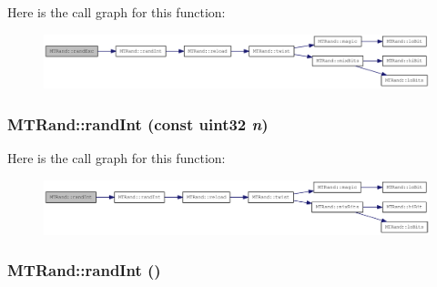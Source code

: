 Here is the call graph for this function:\nopagebreak
\begin{figure}[H]
\begin{center}
\leavevmode
\includegraphics[width=409pt]{classMTRand_afd05e468983b3a3d66ce0f403bd666af_cgraph}
\end{center}
\end{figure}
\hypertarget{classMTRand_a3515bbf6e1b46680a4ce6968451942b6}{
\subsubsection[{randInt}]{ MTRand::randInt (const {\bf uint32} {\em n})}}
\label{classMTRand_a3515bbf6e1b46680a4ce6968451942b6}


Here is the call graph for this function:\nopagebreak
\begin{figure}[H]
\begin{center}
\leavevmode
\includegraphics[width=407pt]{classMTRand_a3515bbf6e1b46680a4ce6968451942b6_cgraph}
\end{center}
\end{figure}
\hypertarget{classMTRand_ad1008efd4fe0e8aae30459c2c58cfe35}{
\subsubsection[{randInt}]{ MTRand::randInt ()}}
\label{classMTRand_ad1008efd4fe0e8aae30459c2c58cfe35}


